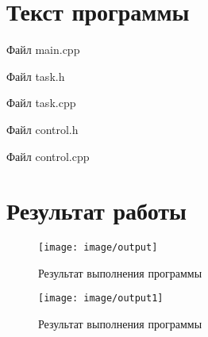 \documentclass[14pt, a4paper]{extreport}
\begin{document}
\chapter{Текст программы}

\noindent Файл main.cpp

\pagebreak
\hrulefill

\noindent Файл task.h

\hrulefill

\noindent Файл task.cpp

\hrulefill

\noindent Файл control.h

\hrulefill

\noindent Файл control.cpp


\chapter{Результат работы}

\begin{figure}[h!]
	\centering
	\texttt{[image: image/output]}
  \caption{Результат выполнения программы }
\end{figure}

\begin{figure}[h!]
	\centering
	\texttt{[image: image/output1]}
  \caption{Результат выполнения программы }
\end{figure}



\end{document}
